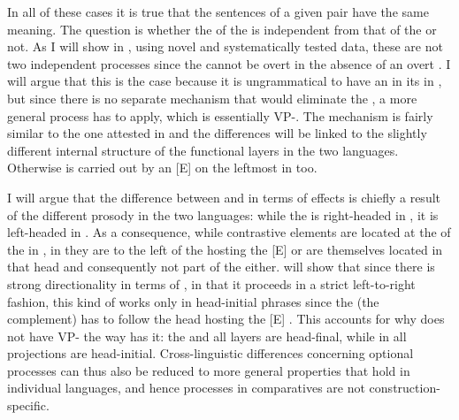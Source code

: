 In all of these cases it is true that the sentences of a given pair have the same meaning. The question is whether the  of the  is independent from that of the  or not. As I will show in , using novel and systematically tested data, these are not two independent processes since the  cannot be overt in the absence of an overt . I will argue that this is the case because it is ungrammatical to have an  in its  in , but since there is no separate mechanism that would eliminate the , a more general  process has to apply, which is essentially VP-. The  mechanism is fairly similar to the one attested in  and the differences will be linked to the slightly different internal structure of the functional layers in the two languages. Otherwise  is carried out by an [E]  on the leftmost  in  too.

I will argue that the difference between  and  in terms of  effects is chiefly a result of the different prosody in the two languages: while the  is right-headed in , it is left-headed in . As a consequence, while contrastive elements are located at the  of the  in , in  they are to the left of the  hosting the [E]  or are themselves located in that head and consequently not part of the  either.  will show that since there is strong directionality in terms of , in that it proceeds in a strict left-to-right fashion, this kind of  works only in head-initial phrases since the  (the complement) has to follow the head hosting the [E] . This accounts for why  does not have VP- the way  has it: the   and all  layers are head-final, while in  all  projections are head-initial. Cross-linguistic differences concerning optional  processes can thus also be reduced to more general properties that hold in individual languages, and hence  processes in comparatives are not construction-specific.

